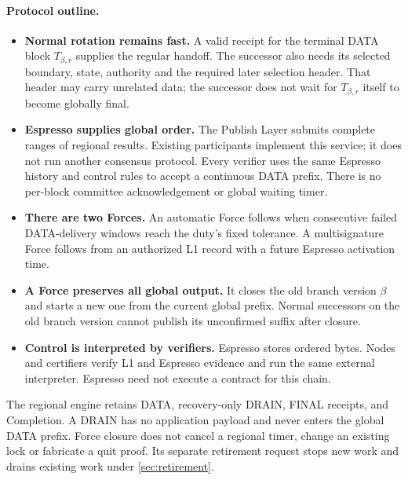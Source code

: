 \documentclass[11pt,a4paper]{article}
\newcounter{protocol}
\begin{document}
\paragraph{Protocol outline.}
\begin{itemize}
\item \textbf{Normal rotation remains fast.} A valid receipt for the
terminal DATA block $T_{\beta,r}$ supplies the regular handoff. The
successor also needs its selected boundary, state, authority and the
required later selection header. That header may carry unrelated data;
the successor does not wait for $T_{\beta,r}$ itself to become globally final.
\item \textbf{Espresso supplies global order.} The Publish Layer submits
complete ranges of regional results. Existing participants implement this
service; it does not run another consensus protocol. Every verifier uses the same
Espresso history and control rules to accept a continuous DATA prefix.
There is no per-block committee acknowledgement or global waiting timer.
\item \textbf{There are two Forces.} An automatic Force follows when
consecutive failed DATA-delivery windows reach the duty's fixed tolerance. A multisignature Force follows from an
authorized L1 record with a future Espresso activation time.
\item \textbf{A Force preserves all global output.} It closes the old
branch version $\beta$ and starts a new one from the current
global prefix. Normal successors on the old branch version cannot publish its
unconfirmed suffix after closure.
\item \textbf{Control is interpreted by verifiers.} Espresso stores
ordered bytes. Nodes and certifiers verify L1 and Espresso evidence and
run the same external interpreter. Espresso need not execute a contract
for this chain.
\end{itemize}

The regional engine retains DATA, recovery-only DRAIN, FINAL receipts,
and Completion. A DRAIN has no application payload and never enters the
global DATA prefix. Force closure does not cancel a regional timer,
change an existing lock or fabricate a quit proof. Its separate retirement
request stops new work and drains existing work under \cref{sec:retirement}.
\end{document}
